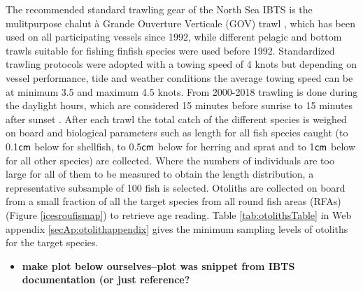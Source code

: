 \documentclass[a4paper 12pt]{article}
\numberwithin{equation}{section}
\newcommand{\cm}{\textnormal{\sffamily cm}\xspace}
\begin{document}
\indent The recommended standard trawling gear of the North Sea IBTS is the mulitpurpose chalut {\`a} Grande Ouverture Verticale (GOV) trawl \citep{ICES2012}, which has been used on all participating vessels since 1992, while different pelagic and bottom trawls suitable for fishing finfish species were used before 1992. Standardized trawling protocols were adopted with a towing speed of 4 knots but depending on vessel performance, tide and weather conditions the average towing speed can be at minimum 3.5 and maximum 4.5 knots. From 2000-2018 trawling is done during the daylight hours, which are considered 15 minutes before sunrise to 15 minutes  after sunset \citep{ICES2012}. After each trawl the total catch of the different species is weighed on board and biological parameters such as length for all fish species caught (to 0.1$\cm$ below for shellfish, to 0.5$\cm$ below for herring and sprat and to 1$\cm$ below for all other species) are collected. Where the numbers of individuals are too large for all of them  to be measured to obtain the length distribution, a representative subsample of 100 fish is selected. Otoliths are collected on board from a small fraction of all the target species from all  round fish areas (RFAs) (Figure \ref{icesroufismap}) to retrieve age reading. Table \ref{tab:otolithsTable} in Web appendix \ref{secAp:otolithappendix} gives the minimum sampling levels of otoliths for the target species.
\begin{itemize}
\item {\bf make plot below ourselves--plot was snippet from IBTS documentation (or just reference?}
\end{itemize}
\end{document}
